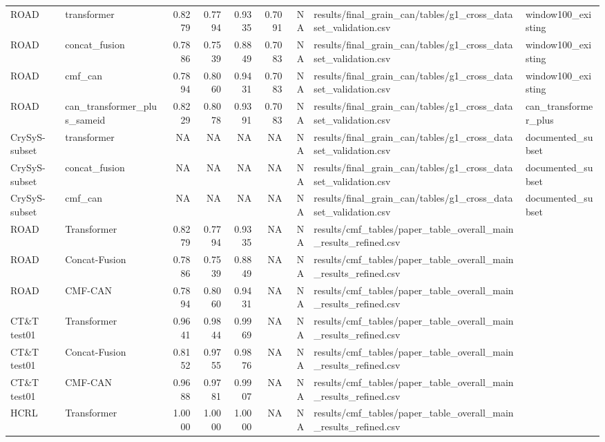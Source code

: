 \begin{tabular}{llrrrrrll}
ROAD & transformer & 0.8279 & 0.7794 & 0.9335 & 0.7091 & NA & results/final\_grain\_can/tables/g1\_cross\_dataset\_validation.csv & window100\_existing \\
ROAD & concat\_fusion & 0.7886 & 0.7539 & 0.8849 & 0.7083 & NA & results/final\_grain\_can/tables/g1\_cross\_dataset\_validation.csv & window100\_existing \\
ROAD & cmf\_can & 0.7894 & 0.8060 & 0.9431 & 0.7083 & NA & results/final\_grain\_can/tables/g1\_cross\_dataset\_validation.csv & window100\_existing \\
ROAD & can\_transformer\_plus\_sameid & 0.8229 & 0.8078 & 0.9391 & 0.7083 & NA & results/final\_grain\_can/tables/g1\_cross\_dataset\_validation.csv & can\_transformer\_plus \\
CrySyS-subset & transformer & NA & NA & NA & NA & NA & results/final\_grain\_can/tables/g1\_cross\_dataset\_validation.csv & documented\_subset \\
CrySyS-subset & concat\_fusion & NA & NA & NA & NA & NA & results/final\_grain\_can/tables/g1\_cross\_dataset\_validation.csv & documented\_subset \\
CrySyS-subset & cmf\_can & NA & NA & NA & NA & NA & results/final\_grain\_can/tables/g1\_cross\_dataset\_validation.csv & documented\_subset \\
ROAD & Transformer & 0.8279 & 0.7794 & 0.9335 & NA & NA & results/cmf\_tables/paper\_table\_overall\_main\_results\_refined.csv &  \\
ROAD & Concat-Fusion & 0.7886 & 0.7539 & 0.8849 & NA & NA & results/cmf\_tables/paper\_table\_overall\_main\_results\_refined.csv &  \\
ROAD & CMF-CAN & 0.7894 & 0.8060 & 0.9431 & NA & NA & results/cmf\_tables/paper\_table\_overall\_main\_results\_refined.csv &  \\
CT\&T test01 & Transformer & 0.9641 & 0.9844 & 0.9969 & NA & NA & results/cmf\_tables/paper\_table\_overall\_main\_results\_refined.csv &  \\
CT\&T test01 & Concat-Fusion & 0.8152 & 0.9755 & 0.9876 & NA & NA & results/cmf\_tables/paper\_table\_overall\_main\_results\_refined.csv &  \\
CT\&T test01 & CMF-CAN & 0.9688 & 0.9781 & 0.9907 & NA & NA & results/cmf\_tables/paper\_table\_overall\_main\_results\_refined.csv &  \\
HCRL & Transformer & 1.0000 & 1.0000 & 1.0000 & NA & NA & results/cmf\_tables/paper\_table\_overall\_main\_results\_refined.csv &  \\

\end{tabular}
